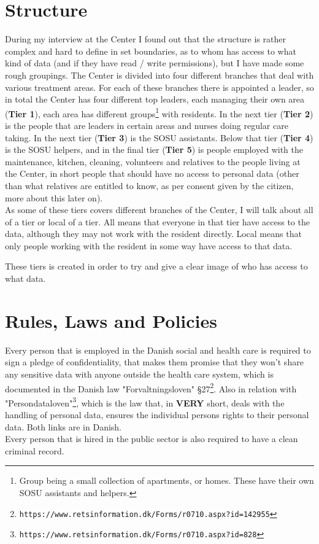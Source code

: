 \documentclass[11pt]{article}
\begin{document}
\section{Structure}
During my interview at the Center I found out that the structure is rather complex and hard to define in set boundaries, as to whom has access to what kind of data (and if they have read / write permissions), but I have made some rough groupings.
The Center is divided into four different branches that deal with various treatment areas. For each of these  branches there is appointed a leader, so in total the Center has four different top leaders, each managing their own area (\textbf{Tier 1}), each area has different groups\footnote{Group being a small collection of apartments, or homes. These have their own SOSU assistants and helpers.} with residents. In the next tier (\textbf{Tier 2}) is the people that are leaders in certain areas and nurses doing regular care taking. In the next tier (\textbf{Tier 3}) is the SOSU assistants. Below that tier (\textbf{Tier 4}) is the SOSU helpers, and in the final tier (\textbf{Tier 5}) is people employed with the maintenance, kitchen, cleaning, volunteers and relatives to the people living at the Center, in short people that should have no access to personal data (other than what relatives are entitled to know, as per consent given by the citizen, more about this later on).\\
As some of these tiers covers different branches of the Center, I will talk about all of a tier or local of a tier. All means that everyone in that tier have access to the data, although they may not work with the resident directly. Local means that only people working with the resident in some way have access to that data.

These tiers is created in order to try and give a clear image of who has access to what data.
\section{Rules, Laws and Policies}
Every person that is employed in the Danish social and health care is required to sign a pledge of confidentiality, that makes them promise that they won't share any sensitive data with anyone outside the health care system, which is documented in the Danish law "Forvaltningsloven" §27\footnote{ \texttt{https://www.retsinformation.dk/Forms/r0710.aspx?id=142955} }. Also in relation with "Persondataloven"\footnote{ \texttt{https://www.retsinformation.dk/Forms/r0710.aspx?id=828} }, which is the law that, in \textbf{VERY} short, deals with the handling of personal data, ensures the individual persons rights to their personal data. Both links are in Danish.\\
Every person that is hired in the public sector is also required to have a clean criminal record.
\end{document}
